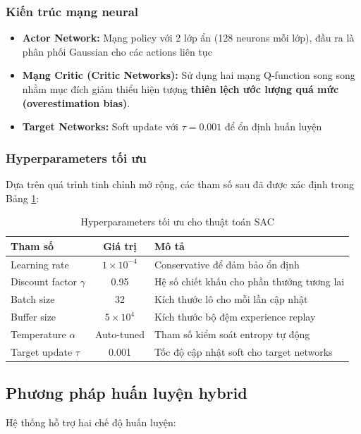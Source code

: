\subsubsection{Kiến trúc mạng neural}
\begin{itemize}
    \item \textbf{Actor Network:} Mạng policy với 2 lớp ẩn (128 neurons mỗi lớp),
        đầu ra là phân phối Gaussian cho các actions liên tục

    \item \textbf{Mạng Critic (Critic Networks):} Sử dụng hai mạng Q-function song song nhằm mục đích giảm thiểu hiện tượng \textbf{thiên lệch ước lượng quá mức (overestimation bias)}.

    \item \textbf{Target Networks:} Soft update với $\tau = 0.001$ để ổn định
        huấn luyện
\end{itemize}

\subsubsection{Hyperparameters tối ưu}
Dựa trên quá trình tinh chỉnh mở rộng, các tham số sau đã được xác định trong Bảng \ref{tab:sac_hyperparameters}:

\begin{table}[!htp]
\centering
\caption{Hyperparameters tối ưu cho thuật toán SAC}
\label{tab:sac_hyperparameters}
\begin{tabular}{|l|c|p{5cm}|}
\hline
\textbf{Tham số} & \textbf{Giá trị} & \textbf{Mô tả} \\
\hline
Learning rate & $1 \times 10^{-4}$ & Conservative để đảm bảo ổn định \\
\hline
Discount factor $\gamma$ & 0.95 & Hệ số chiết khấu cho phần thưởng tương lai \\
\hline
Batch size & 32 & Kích thước lô cho mỗi lần cập nhật \\
\hline
Buffer size & $5 \times 10^{4}$ & Kích thước bộ đệm experience replay \\
\hline
Temperature $\alpha$ & Auto-tuned & Tham số kiểm soát entropy tự động \\
\hline
Target update $\tau$ & 0.001 & Tốc độ cập nhật soft cho target networks \\
\hline
\end{tabular}
\end{table}

\subsection{Phương pháp huấn luyện hybrid}
Hệ thống hỗ trợ hai chế độ huấn luyện:

